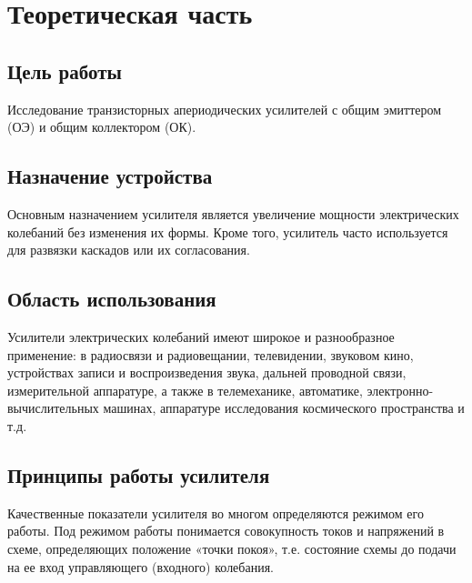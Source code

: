 



\def\labauthors{Виноградов И.Д., Понур К.А., Шиков А.П.}
\def\labgroup{430}
\def\labnumber{5}
\def\labtheme{Апериодический усилитель}
\renewcommand{\vec}{\mathbf}
\renewcommand{\Re}{\operatorname{Re}}
\renewcommand{\Im}{\operatorname{Im}}
\renewcommand{\phi}{\varphi}
\renewcommand{\hat}{\widehat}



\tableofcontents
\newpage

\section{Теоретическая часть}
\subsection*{Цель работы}
Исследование транзисторных апериодических усилителей с общим эмиттером (ОЭ) и общим коллектором (ОК).

\subsection*{Назначение устройства}
Основным назначением усилителя является увеличение мощности электрических колебаний без изменения их формы. Кроме того, усилитель часто используется для развязки каскадов или их согласования.

\subsection*{Область использования}
Усилители электрических колебаний имеют широкое и разнообразное применение: в радиосвязи и радиовещании, телевидении, звуковом кино, устройствах записи и воспроизведения звука, дальней проводной связи, измерительной аппаратуре, а также в телемеханике, автоматике, электронно-вычислительных машинах, аппаратуре исследования космического пространства и т.д.

\subsection{Принципы работы усилителя}
Качественные показатели усилителя во многом определяются режимом его работы. Под режимом работы понимается совокупность токов и напряжений в схеме, определяющих положение «точки покоя», т.е. состояние схемы до подачи на ее вход управляющего (входного) колебания.

